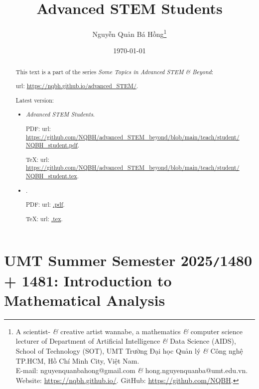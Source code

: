 \documentclass{article}
\title{Advanced STEM Students}
\author{Nguyễn Quản Bá Hồng\footnote{A scientist- {\it\&} creative artist wannabe, a mathematics {\it\&} computer science lecturer of Department of Artificial Intelligence {\it\&} Data Science (AIDS), School of Technology (SOT), UMT Trường Đại học Quản lý {\it\&} Công nghệ TP.HCM, Hồ Chí Minh City, Việt Nam.\\E-mail: {\sf nguyenquanbahong@gmail.com} {\it\&} {\sf hong.nguyenquanba@umt.edu.vn}. Website: \url{https://nqbh.github.io/}. GitHub: \url{https://github.com/NQBH}.}}
\date{\today}
\begin{document}
\maketitle
\begin{abstract}
	This text is a part of the series {\it Some Topics in Advanced STEM \& Beyond}:
	
	{\sc url}: \url{https://nqbh.github.io/advanced_STEM/}.
	
	Latest version:
	\begin{itemize}
		\item {\it Advanced STEM Students}.
		
		PDF: {\sc url}: \url{https://github.com/NQBH/advanced_STEM_beyond/blob/main/teach/student/NQBH_student.pdf}.
		
		\TeX: {\sc url}: \url{https://github.com/NQBH/advanced_STEM_beyond/blob/main/teach/student/NQBH_student.tex}.
		\item {\it }.
		
		PDF: {\sc url}: \url{.pdf}.
		
		\TeX: {\sc url}: \url{.tex}.
	\end{itemize}
\end{abstract}
\tableofcontents


\section{UMT Summer Semester 2025{\tt/}1480 + 1481: Introduction to Mathematical Analysis}
\end{document}
